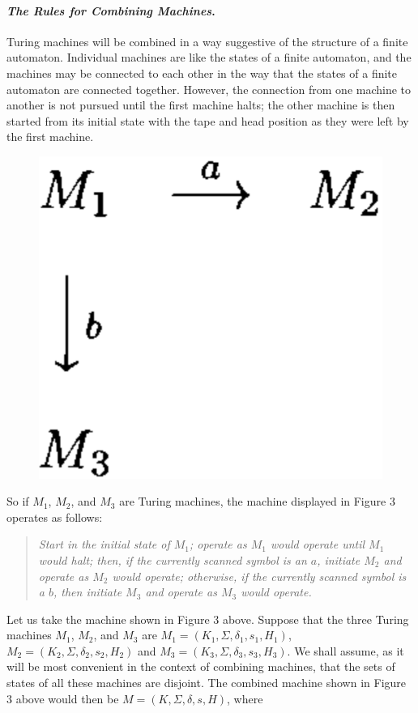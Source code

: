 \paragraph{\textit{The Rules for Combining Machines}.} Turing machines will be combined in a way suggestive of the structure of a finite automaton. Individual machines are like the states of a finite automaton, and the machines may be connected to each other in the way that the states of a finite automaton are connected together. However, the connection from one machine to another is not pursued until the first machine halts; the other machine is then started from its initial state with the tape and head position as they were left by the first machine. 
\begin{figure}[H]
  \centering
  \includegraphics[width=.27\linewidth]{img/fig-4.3.png}
  \caption{}
  \label{fig:4.3}
\end{figure}
So if $M_1$, $M_2$, and $M_3$ are Turing machines, the machine displayed in Figure 3 operates as follows:
\begin{quotation}
  \textit{Start in the initial state of $M_1$; operate as $M_1$ would operate until $M_1$ would halt; then, if the currently scanned symbol is an $a$, initiate $M_2$ and operate as $M_2$ would operate; otherwise, if the currently scanned symbol is a $b$, then initiate $M_3$ and operate as $M_3$ would operate.}
\end{quotation}
Let us take the machine shown in Figure 3 above. Suppose that the three Turing machines $M_1$, $M_2$, and $M_3$ are $M_1 = (K_1, \Sigma, \delta_1, s_1, H_1)$, $M_2 = (K_2, \Sigma, \delta_2, s_2, H_2)$ and $M_3 = (K_3, \Sigma, \delta_3, s_3, H_3)$. We shall assume, as it will be most convenient in the context of combining machines, that the sets of states of all these machines are disjoint. The combined machine shown in Figure 3 above would then be $M = (K, \Sigma, \delta, s, H)$, where
